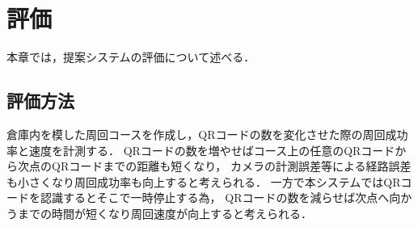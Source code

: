 \chapter{評価}
\label{evaluation}
本章では，提案システムの評価について述べる．

\section{評価方法}
倉庫内を模した周回コースを作成し，QRコードの数を変化させた際の周回成功率と速度を計測する．
QRコードの数を増やせばコース上の任意のQRコードから次点のQRコードまでの距離も短くなり，
カメラの計測誤差等による経路誤差も小さくなり周回成功率も向上すると考えられる．
一方で本システムではQRコードを認識するとそこで一時停止する為，
QRコードの数を減らせば次点へ向かうまでの時間が短くなり周回速度が向上すると考えられる．



